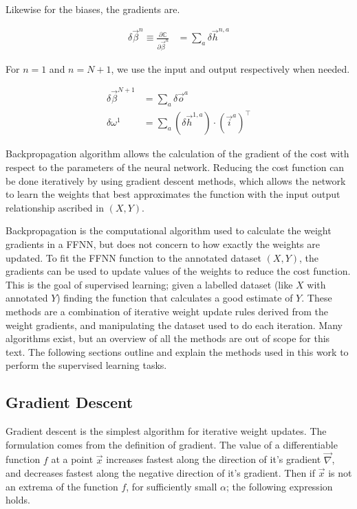 \documentclass[../dissertation.tex]{subfiles}
\begin{document}
Likewise for the biases, the gradients are.

\begin{align}
    \delta \vec{\beta}^{n} \equiv \frac{\partial \mathbb{C}}{\partial \vec{\beta}^{n}} & =
        \sum_a \delta \vec{h}^{n, a}
\end{align}

For $n=1$ and $n=N+1$, we use the input and output respectively when needed.

\begin{align}
    \delta \vec{\beta}^{N+1}    & = \sum_a \delta \vec{o}^{a} \\
    \delta \omega^{1}           & = \sum_a 
        \left( \delta \vec{h}^{1, a} \right) \cdot \left( \vec{i}^{a} \right)^\intercal
\end{align}

Backpropagation algorithm allows the calculation of the gradient of the cost with respect to the parameters of the neural network.
Reducing the cost function can be done iteratively by using gradient descent methods, which allows the network to learn the weights that best approximates the function with the input output relationship ascribed in $(X, Y)$.

Backpropagation is the computational algorithm used to calculate the weight gradients in a FFNN, but does not concern to how exactly the weights are updated.
To fit the FFNN function to the annotated dataset $(X, Y)$, the gradients can be used to update values of the weights to reduce the cost function.
This is the goal of supervised learning; given a labelled dataset (like $X$ with annotated $Y$) finding the function that calculates a good estimate of $Y$.
These methods are a combination of iterative weight update rules derived from the weight gradients, and manipulating the dataset used to do each iteration.
Many algorithms exist, but an overview of all the methods are out of scope for this text.
The following sections outline and explain the methods used in this work to perform the supervised learning tasks.

\subsection{Gradient Descent}

Gradient descent is the simplest algorithm for iterative weight updates.
The formulation comes from the definition of gradient.
The value of a differentiable function $f$ at a point $\vec{x}$ increases fastest along the direction of it's gradient $\vec{\nabla}$,
and decreases fastest along the negative direction of it's gradient.
Then if $\vec{x}$ is not an extrema of the function $f$, for sufficiently small $\alpha$; the following expression holds.
\end{document}
